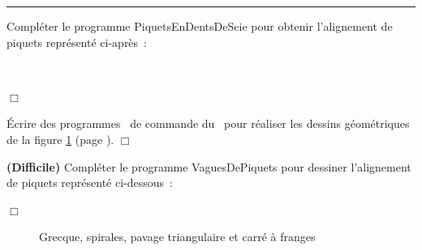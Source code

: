 \noindent \rule{137mm}{0.1mm} %
\begin{exercice}{ Compléter le programme {\idt PiquetsEnDentsDeScie} pour
ob\-te\-nir l'alignement de piquets représenté ci-après~:
\clearpage

\raggedright{
\vspace*{20mm}%
\ \\%
}



\noindent $\Box$}\end{exercice}
\begin{exercice}{ Écrire des programmes \pascal\ de commande du \robot\ pour réaliser les
dessins géométriques de la figure  \ref{fig:spcf} (page  \pageref{fig:spcf}). $\Box$}\end{exercice}
\begin{exercice}{{\bf (Difficile)} Compléter le programme {\idt VaguesDePiquets} pour
des\-si\-ner l'alignement de piquets représenté ci-dessous~:

\pagebreak[3]
\raggedright{
\vspace{0.5cm}

}


\noindent $\Box$}\end{exercice}
\begin{figure}[hb]%
\caption{Grecque, spirales, pavage triangulaire et carré à franges}
 \label{fig:spcf}
\end{figure}

\clearpage

